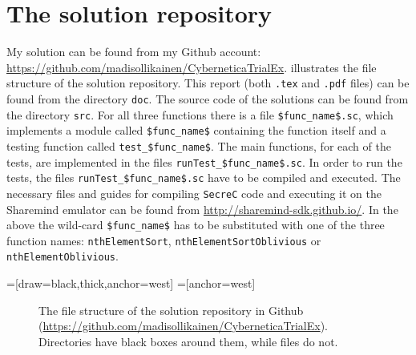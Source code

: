 \documentclass[11pt]{article}
\newcommand{\ct}[1]{\texttt{#1}}
\newcommand{\SC}{\ct{SecreC}\xspace}
\begin{document}

\section{The solution repository} %
\label{sec:the_solution_repository}

My solution can be found from my Github account: \url{https://github.com/madisollikainen/CyberneticaTrialEx}.  illustrates the file structure of the solution repository. This report (both \ct{.tex} and \ct{.pdf} files) can be found from the directory \ct{doc}. The source code of the solutions can be found from the directory \ct{src}. For all three functions there is a file \ct{\$func\_name\$.sc}, which implements a module called \ct{\$func\_name\$} containing the function itself and a testing function called \ct{test\_\$func\_name\$}. The main functions, for each of the tests, are implemented in the files \ct{runTest\_\$func\_name\$.sc}. In order to run the tests, the files \ct{runTest\_\$func\_name\$.sc} have to be compiled and executed. The necessary files and guides for compiling \SC code and executing it on the Sharemind emulator can be found from \url{http://sharemind-sdk.github.io/}. In the above the wild-card \ct{\$func\_name\$} has to be substituted with one of the three function names: \ct{nthElementSort}, \ct{nthElementSortOblivious} or \ct{nthElementOblivious}.

=[draw=black,thick,anchor=west]
=[anchor=west]
\begin{figure}[h]
\centering
\caption{The file structure of the solution repository in Github (\url{https://github.com/madisollikainen/CyberneticaTrialEx}). Directories have black boxes around them, while files do not.}
\label{fig:solution_file_structure}
\end{figure}
\end{document}

